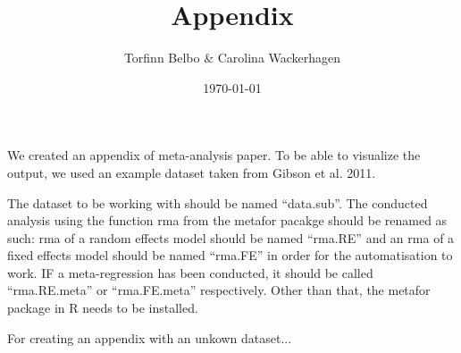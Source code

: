 \documentclass[11pt, a4paper]{article}
\begin{document}
\title{Appendix}
\author{Torfinn Belbo \& Carolina Wackerhagen}

\date{\today}

\maketitle 

We created an appendix of meta-analysis paper. To be able to visualize the output, we used an example dataset taken from Gibson et al. 2011.

The dataset to be working with should be named ``data.sub''. The conducted analysis using the function rma from the metafor pacakge should be renamed as such: rma of a random effects model should be named ``rma.RE'' and an rma of a fixed effects model should be named ``rma.FE'' in order for the automatisation to work. IF a meta-regression has been conducted, it should be called ``rma.RE.meta'' or ``rma.FE.meta'' respectively. Other than that, the metafor package in R needs to be installed.  

For creating an appendix with an unkown dataset... 
\end{document}
